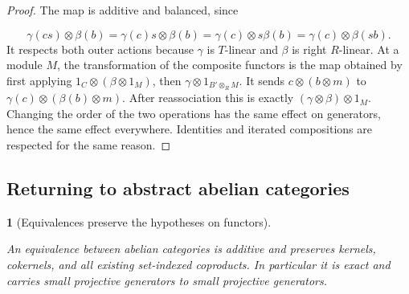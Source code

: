 \documentclass[11pt,a4paper]{article}
\newcommand{\mathheading}{}
\theoremstyle{plain}
\newtheorem*{plainstatement}{\mathheading}
\theoremstyle{definition}
\newenvironment{mathstatement}[3]{\renewcommand{\mathheading}{#1 #2}\begin{plainstatement}[#3]}{\end{plainstatement}}
\begin{document}
\begin{proof}

The map is additive and balanced, since

 \[\gamma(cs)\otimes\beta(b)=\gamma(c)s\otimes\beta(b)=\gamma(c)\otimes s\beta(b)=\gamma(c)\otimes\beta(sb).\] 
It respects both outer actions because \(\gamma\) is \(T\)-linear and \(\beta\) is right \(R\)-linear. At a module \(M\), the transformation of the composite functors is the map obtained by first applying \(1_C\otimes(\beta\otimes1_M)\), then \(\gamma\otimes1_{B'\otimes_RM}\). It sends \(c\otimes(b\otimes m)\) to \(\gamma(c)\otimes(\beta(b)\otimes m)\). After reassociation this is exactly \((\gamma\otimes\beta)\otimes1_M\). Changing the order of the two operations has the same effect on generators, hence the same effect everywhere. Identities and iterated compositions are respected for the same reason.


\end{proof}
 
\subsection{Returning to abstract abelian categories}
\label{transport}

\begin{mathstatement}{Lemma}{10.3}{Equivalences preserve the hypotheses on functors}
\label{env-10-3}

An equivalence between abelian categories is additive and preserves kernels, cokernels, and all existing set-indexed coproducts. In particular it is exact and carries small projective generators to small projective generators.


\par{}\par

\end{mathstatement}
 
\end{document}

